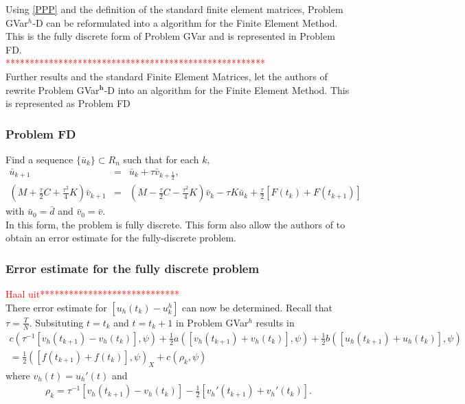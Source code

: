 \documentclass[../../main.tex]{subfiles}
\begin{document}
Using \eqref{PPP} and the definition of the standard finite element matrices, Problem GVar$^h$-D can be reformulated into a algorithm for the Finite Element Method. This is the fully discrete form of Problem GVar and is represented in Problem FD.\\
\textcolor{red}{******************************************************}\\

Further results and the standard Finite Element Matrices, let the authors of \cite{BV13} rewrite Problem GVar$^\mathbf{{h}}$-D into an algorithm for the Finite Element Method. This is represented as Problem FD

\subsubsection*{Problem FD}
Find a sequence $\{\bar{u}_{k}\}\subset R_{n}$ such that for each $k,$
\begin{eqnarray*}
	\bar{u}_{k+1}\ & = & \bar{u}_{k}+\tau\bar{v}_{k+\frac{1}{2}},\\
	(M + \frac{\tau}{2}C+\frac{\tau^{2}}{4}K)\bar{v}_{k+1} & = & (M- \frac{\tau}{2}C-\frac{\tau^{2}}{4}K)\bar{v}_{k}-\tau K\bar{u}_{k}+\frac{\tau}{2}[F(t_{k})+F(t_{k+1})]
\end{eqnarray*}
with $\bar{u}_{0}=\bar{d}$ and $\bar{v}_{0}=\bar{v}.$\\

In this form, the problem is fully discrete. This form also allow the authors of \cite{BV13} to obtain an error estimate for the fully-discrete problem.

\subsubsection{Error estimate for the fully discrete problem}

\textcolor{red}{Haal uit*****************************}\\
There error estimate for $[u_h(t_k) - u^h_k]$ can now be determined. Recall that $\tau = \frac{T}{N}$. Subsituting $t = t_k$ and $t = t_k+1$ in Problem GVar$^h$ results in
\begin{eqnarray*}
	c( \tau^{-1}[v_{h}(t_{k+1})-v_{h}(t_{k})], \psi)+\frac{1}{2}a([v_{h}(t_{k+1})+v_{h}(t_{k})], \psi)+\frac{1}{2}b([u_{h}(t_{k+1})+u_{h}(t_{k})], \psi) \\
	=\frac{1}{2}([f(t_{k+1})+f(t_{k})], \psi)_{X}+c(\rho_{k}, \psi)
\end{eqnarray*}
where $v_{h}(t)=u_{h}'(t)$ and
\begin{eqnarray*}
	\rho_{k}=\tau^{-1}[v_{h}(t_{k+1})-v_{h}(t_{k})]-\frac{1}{2}[v_{h}'(t_{k+1})+v_{h}'(t_{k})].
\end{eqnarray*}
\end{document}
